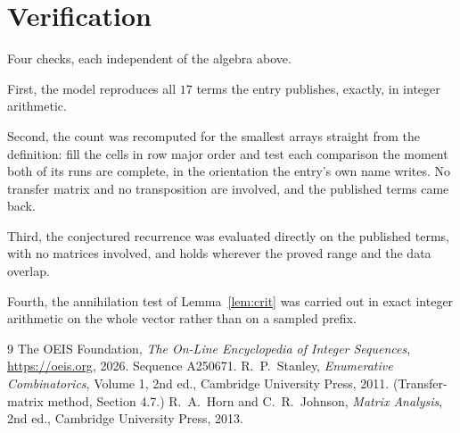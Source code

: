 \documentclass[11pt,a4paper]{article}
\theoremstyle{plain}
\theoremstyle{definition}
\begin{document}
\section{Verification}

Four checks, each independent of the algebra above.

First, the model reproduces all $17$ terms the entry publishes, exactly, in integer
arithmetic.

Second, the count was recomputed for the smallest arrays straight from the definition: fill the
cells in row major order and test each comparison the moment both of its runs are complete,
in the orientation the entry's own name writes. No transfer matrix and no transposition are
involved, and the published terms came back.

Third, the conjectured recurrence was evaluated directly on the published terms, with no
matrices involved, and holds wherever the proved range and the data overlap.

Fourth, the annihilation test of Lemma~\ref{lem:crit} was carried out in exact integer
arithmetic on the whole vector rather than on a sampled prefix.

\begin{thebibliography}{9}
 The OEIS Foundation, \emph{The On-Line Encyclopedia of Integer
Sequences}, \url{https://oeis.org}, 2026. Sequence A250671.
 R.~P.~Stanley, \emph{Enumerative Combinatorics}, Volume 1, 2nd ed.,
Cambridge University Press, 2011. (Transfer-matrix method, Section 4.7.)
 R.~A.~Horn and C.~R.~Johnson, \emph{Matrix Analysis}, 2nd ed., Cambridge
University Press, 2013.
\end{thebibliography}
\end{document}
